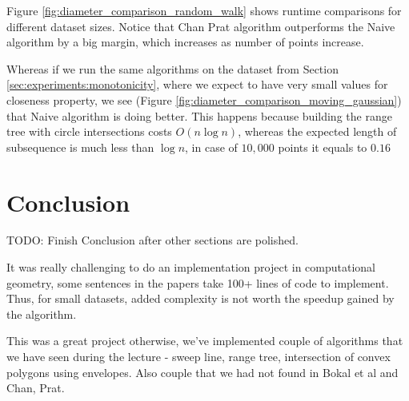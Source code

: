 \documentclass{article}
\begin{document}
Figure \ref{fig:diameter_comparison_random_walk} shows runtime
comparisons for different dataset sizes. Notice that Chan Prat
algorithm outperforms the Naive algorithm by a big margin, which
increases as number of points increase.

Whereas if we run the same algorithms on the dataset from Section
\ref{sec:experiments:monotonicity}, where we expect to have very
small values for closeness property, we see (Figure
\ref{fig:diameter_comparison_moving_gaussian}) that Naive algorithm
is doing better. This happens because building the range tree with
circle intersections costs $O(n \log n)$, whereas the expected
length of subsequence is much less than $\log n$, in case of $10,000$
points it equals to $0.16$

\section{Conclusion}
\label{sec:conclusion}

TODO: Finish Conclusion after other sections are polished.

It was really challenging to do an implementation project in computational geometry, some sentences in the papers take 100+ lines of code to implement. Thus, for small datasets, added complexity is not worth the speedup gained by the algorithm.

This was a great project otherwise, we've implemented couple of algorithms that we have seen during the lecture - sweep line, range tree, intersection of convex polygons using envelopes. Also couple that we had not found in Bokal et al and Chan, Prat.



\end{document}
